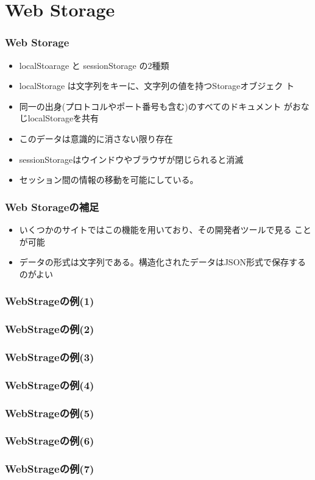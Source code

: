  \section{Web Storage}
\begin{frame}[containsverbatim]
 \frametitle{Web Storage}
 \begin{itemize}
 \item localStoarage と sessionStorage の2種類
 \item localStorage は文字列をキーに、文字列の値を持つStorageオブジェク
 ト
 \item 同一の出身(プロトコルやポート番号も含む)のすべてのドキュメント
 がおなじlocalStorageを共有
 \item このデータは意識的に消さない限り存在
 \item sessionStorageはウインドウやブラウザが閉じられると消滅
 \item セッション間の情報の移動を可能にしている。
 \end{itemize}
 \end{frame}
 \begin{frame}[containsverbatim]
 \frametitle{Web Storageの補足}
 \begin{itemize}
 \item いくつかのサイトではこの機能を用いており、その開発者ツールで見る
       ことが可能
 \item データの形式は文字列である。構造化されたデータはJSON形式で保存するのがよい
 \end{itemize}
 \end{frame}
\begin{frame}[containsverbatim]
 \frametitle{WebStrageの例(1)}
 \end{frame}
\begin{frame}[containsverbatim]
 \frametitle{WebStrageの例(2)}
 \end{frame}
\begin{frame}[containsverbatim]
 \frametitle{WebStrageの例(3)}
 \end{frame}
\begin{frame}[containsverbatim]
 \frametitle{WebStrageの例(4)}
 \end{frame}
\begin{frame}[containsverbatim]
 \frametitle{WebStrageの例(5)}
 \end{frame}
\begin{frame}[containsverbatim]
 \frametitle{WebStrageの例(6)}
 \end{frame}
\begin{frame}[containsverbatim]
 \frametitle{WebStrageの例(7)}
 \end{frame}

